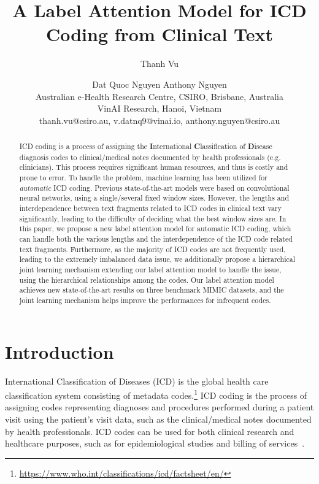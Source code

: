 \documentclass{article}
\title{A Label Attention Model for ICD Coding from Clinical Text}
\author{
Thanh Vu \and
Dat Quoc Nguyen\And
Anthony Nguyen\\
\affiliations
Australian e-Health Research Centre, CSIRO, Brisbane, Australia\\ 
VinAI Research, Hanoi, Vietnam\\
\emails
{thanh.vu@csiro.au, v.datnq9@vinai.io, anthony.nguyen@csiro.au}
}
\begin{document}
\maketitle

\begin{abstract}







ICD coding is a process of assigning the \textbf{I}nternational \textbf{C}lassification of \textbf{D}isease diagnosis codes to clinical/medical notes documented by health professionals (e.g. clinicians). This process requires significant human resources, and thus is costly and prone to error. 
To handle the problem, machine learning has been utilized for \emph{automatic} ICD coding. Previous state-of-the-art models were based on convolutional neural networks, using a single/several fixed window sizes. However, the lengths and interdependence between text fragments related to ICD codes in clinical text vary significantly, leading to the difficulty of deciding what the best window sizes are. 
In this paper, we propose a new label attention model for automatic ICD coding, which can handle both the various lengths and the interdependence of the ICD code related text fragments. Furthermore, as the majority of ICD codes are not frequently used, leading to the extremely imbalanced data issue, we additionally propose a hierarchical joint learning mechanism extending our label attention model to handle the issue, using the hierarchical relationships among the codes. 
Our label attention model achieves new state-of-the-art results on three benchmark MIMIC datasets, and the joint learning mechanism helps improve the performances for infrequent codes.







\end{abstract}

\section{Introduction}
International Classification of Diseases (ICD)  is the global health care classification system consisting of metadata codes.\footnote{\url{https://www.who.int/classifications/icd/factsheet/en/}} ICD coding is the process of assigning codes representing diagnoses and procedures performed during a patient visit using the patient's visit data, such as the clinical/medical notes documented by health professionals. ICD codes can be used for both clinical research and healthcare purposes, such as for epidemiological studies and billing of services~\cite{o2005measuring,nguyen2018computer}. 
\end{document}
